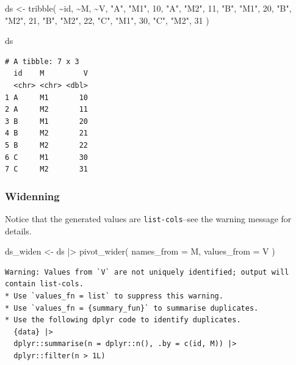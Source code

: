 \documentclass[
  letterpaper,
  DIV=11,
  numbers=noendperiod]{scrreprt}
\newenvironment{Shaded}{\begin{snugshade}}{\end{snugshade}}
\newcommand{\AttributeTok}[1]{\textcolor[rgb]{0.40,0.45,0.13}{#1}}
\newcommand{\DecValTok}[1]{\textcolor[rgb]{0.68,0.00,0.00}{#1}}
\newcommand{\FunctionTok}[1]{\textcolor[rgb]{0.28,0.35,0.67}{#1}}
\newcommand{\NormalTok}[1]{\textcolor[rgb]{0.00,0.23,0.31}{#1}}
\newcommand{\OtherTok}[1]{\textcolor[rgb]{0.00,0.23,0.31}{#1}}
\newcommand{\SpecialCharTok}[1]{\textcolor[rgb]{0.37,0.37,0.37}{#1}}
\newcommand{\StringTok}[1]{\textcolor[rgb]{0.13,0.47,0.30}{#1}}
\begin{document}
\begin{Shaded}
\begin{Highlighting}[]
\NormalTok{ds }\OtherTok{\textless{}{-}} \FunctionTok{tribble}\NormalTok{(}
  \SpecialCharTok{\textasciitilde{}}\NormalTok{id, }\SpecialCharTok{\textasciitilde{}}\NormalTok{M, }\SpecialCharTok{\textasciitilde{}}\NormalTok{V,}
  \StringTok{"A"}\NormalTok{, }\StringTok{"M1"}\NormalTok{, }\DecValTok{10}\NormalTok{,}
  \StringTok{"A"}\NormalTok{, }\StringTok{"M2"}\NormalTok{, }\DecValTok{11}\NormalTok{,}
  \StringTok{"B"}\NormalTok{, }\StringTok{"M1"}\NormalTok{, }\DecValTok{20}\NormalTok{,}
  \StringTok{"B"}\NormalTok{, }\StringTok{"M2"}\NormalTok{, }\DecValTok{21}\NormalTok{,}
  \StringTok{"B"}\NormalTok{, }\StringTok{"M2"}\NormalTok{, }\DecValTok{22}\NormalTok{,}
  \StringTok{"C"}\NormalTok{, }\StringTok{"M1"}\NormalTok{, }\DecValTok{30}\NormalTok{,}
  \StringTok{"C"}\NormalTok{, }\StringTok{"M2"}\NormalTok{, }\DecValTok{31}
\NormalTok{)}

\NormalTok{ds}
\end{Highlighting}
\end{Shaded}

\begin{verbatim}
# A tibble: 7 x 3
  id    M         V
  <chr> <chr> <dbl>
1 A     M1       10
2 A     M2       11
3 B     M1       20
4 B     M2       21
5 B     M2       22
6 C     M1       30
7 C     M2       31
\end{verbatim}

\subsubsection{Widenning}\label{widenning-2}

Notice that the generated values are \texttt{list-cols}--see the warning
message for details.

\begin{Shaded}
\begin{Highlighting}[]
\NormalTok{ds\_widen }\OtherTok{\textless{}{-}}\NormalTok{ ds }\SpecialCharTok{|\textgreater{}} 
  \FunctionTok{pivot\_wider}\NormalTok{(}
    \AttributeTok{names\_from =}\NormalTok{ M,}
    \AttributeTok{values\_from =}\NormalTok{ V}
\NormalTok{  )}
\end{Highlighting}
\end{Shaded}

\begin{verbatim}
Warning: Values from `V` are not uniquely identified; output will contain list-cols.
* Use `values_fn = list` to suppress this warning.
* Use `values_fn = {summary_fun}` to summarise duplicates.
* Use the following dplyr code to identify duplicates.
  {data} |>
  dplyr::summarise(n = dplyr::n(), .by = c(id, M)) |>
  dplyr::filter(n > 1L)
\end{verbatim}
\end{document}
